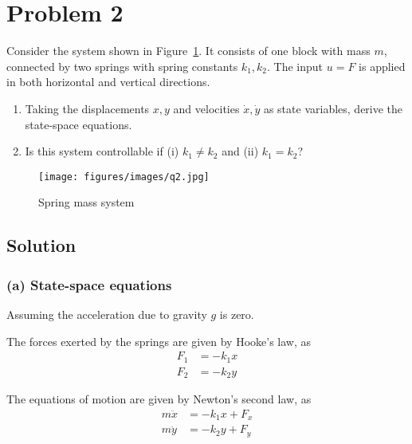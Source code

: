 \section*{Problem 2}

Consider the system shown in Figure~\ref{fig:q2}.
It consists of one block with mass \( m \), connected by two springs with spring constants \( k_{1}, k_{2} \).
The input \( u=F \) is applied in both horizontal and vertical directions.
\begin{enumerate}[label= (\alph*), topsep=3pt, itemsep=-0.2em]
    \item Taking the displacements \( x, y \) and velocities \( \dot{x}, \dot{y} \) as state variables, derive the state-space equations.
    \item Is this system controllable if (i) \( k_{1} \neq k_{2} \) and (ii) \( k_{1}=k_{2} \)?
\end{enumerate}
\begin{figure}[h]
    \centering
    \texttt{[image: figures/images/q2.jpg]}
    \caption{
        Spring mass system
    }\label{fig:q2}
\end{figure}
\vspace*{-2.5em}

\subsection*{Solution}

\subsubsection*{(a) State-space equations}

Assuming the acceleration due to gravity \( g \) is zero.

The forces exerted by the springs are given by Hooke's law, as
\begin{align*}
    F_{1}
     & = -k_{1}x
    \\
    F_{2}
     & = -k_{2}y
\end{align*}

The equations of motion are given by Newton's second law, as
\begin{align*}
    m\ddot{x}
     & = -k_{1}x + F_{x}
    \\
    m\ddot{y}
     & = -k_{2}y + F_{y}
\end{align*}
